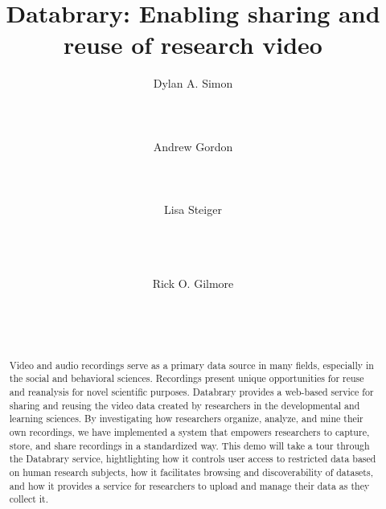 \documentclass{sig-alternate}
\begin{document}

\title{Databrary: Enabling sharing and reuse of research video}


\author{
\alignauthor
Dylan A. Simon\\
	\\
	\\
	\\
\alignauthor
Andrew Gordon\\
	\\
	\\
	\\
\alignauthor
Lisa Steiger\\
	\\
	\\
	\\
\and
Rick O. Gilmore\\
	\\
	\\
	\\
}

\maketitle

\begin{abstract}
Video and audio recordings serve as a primary data source in many fields, especially in the social and behavioral sciences.
Recordings present unique opportunities for reuse and reanalysis for novel scientific purposes.
Databrary provides a web-based service for sharing and reusing the video data created by researchers in the developmental and learning sciences.
By investigating how researchers organize, analyze, and mine their own recordings, we have implemented a system that empowers researchers to capture, store, and share recordings in a standardized way.
This demo will take a tour through the Databrary service, hightlighting how it controls user access to restricted data based on human research subjects, how it facilitates browsing and discoverability of datasets, and how it provides a service for researchers to upload and manage their data as they collect it.
\end{abstract}
\end{document}
